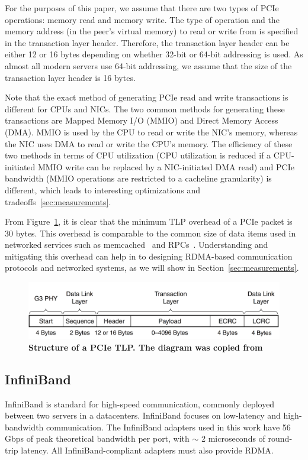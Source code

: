 For the purposes of this paper, we assume that there are two types of PCIe
operations: memory read and memory write. The type of operation and the memory
address (in the peer's virtual memory) to read or write from is specified
in the transaction layer header. Therefore, the transaction layer
header can be either 12 or 16 bytes depending on whether 32-bit or 64-bit
addressing is used.  As almost all modern servers use 64-bit addressing, we
assume that the size of the transaction layer header is 16 bytes.

Note that the exact method of generating PCIe read and write transactions is
different for CPUs and NICs. The two common methods for generating these
transactions are Mapped Memory I/O (MMIO) and Direct Memory Access (DMA). MMIO
is used by the CPU to read or write the NIC's memory, whereas the NIC uses
DMA to read or write the CPU's memory. The efficiency of these two methods in
terms of CPU utilization (CPU utilization is reduced if a CPU-initiated MMIO
write can be replaced by a NIC-initiated DMA read) and PCIe bandwidth (MMIO
operations are restricted to a cacheline granularity) is different, which leads
to interesting optimizations and tradeoffs~\ref{sec:measurements}.

From Figure~\ref{fig:pcie-tlp}, it is clear that the minimum TLP overhead of
a PCIe packet is 30 bytes. This overhead is comparable to the common size of
data items used in networked services such as memcached~\cite{Nishtala:nsdi2013}
and RPCs~\cite{Flajslik:usenix2013}. Understanding and mitigating this overhead
can help in to designing RDMA-based communication protocols and networked
systems, as we will show in Section~\ref{sec:measurements}.

\begin{figure}
	\centering
	\includegraphics[width=.48\textwidth]{figures/pcie-tlp.png}
	\caption{\textbf{Structure of a PCIe TLP. The diagram was copied from~\cite{www-xilinx-pcie}}}
	\label{fig:pcie-tlp}
\end{figure}

\subsection{InfiniBand}
InfiniBand is standard for high-speed communication, commonly deployed between
two servers in a datacenters. InfiniBand focuses on low-latency and
high-bandwidth communication. The InfiniBand adapters used in this work have 56
Gbps of peak theoretical bandwidth per port, with $\sim$ 2 microseconds of
round-trip latency. All InfiniBand-compliant adapters must also provide RDMA.


